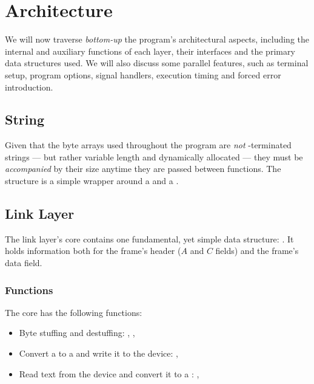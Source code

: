\documentclass[main.tex]{subfiles}
\begin{document}
\section{Architecture}
\label{sec:arch}

We will now traverse \textit{bottom-up} the program's architectural aspects, including the internal and auxiliary functions of each layer, their interfaces and the primary data structures used. We will also discuss some parallel features, such as terminal setup, program options, signal handlers, execution timing and forced error introduction.

\subsection{String}
\label{subsec:string}

Given that the byte arrays used throughout the program are \emph{not} \nullp-terminated strings --- but rather variable length and dynamically allocated --- they must be \textit{accompanied} by their size anytime they are passed between functions. The  structure is a simple wrapper around a  and a .

\subsection{Link Layer}
\label{subsec:llarch}

The link layer's core contains one fundamental, yet simple data structure: . It holds information both for the frame's header ($A$ and $C$ fields) and the frame's data field.

\subsubsection{Functions}
\label{subsubsec:funcllarch}

The core has the following functions:

\begin{itemize}[noitemsep,rightmargin=3em]
\item Byte stuffing and destuffing:
, , 

\item Convert a  to a  and write it to the device:
, 

\item Read text from the device and convert it to a :
, 
\end{itemize}
\end{document}
